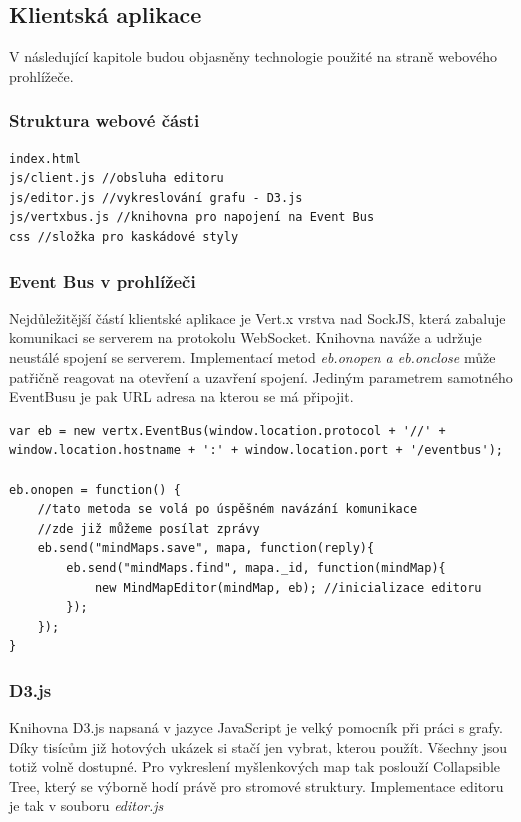 \subsection{Klientská aplikace}

V následující kapitole budou objasněny technologie použité na straně webového prohlížeče.

\subsubsection{Struktura webové části}

\begin{lstlisting}
index.html
js/client.js //obsluha editoru
js/editor.js //vykreslování grafu - D3.js
js/vertxbus.js //knihovna pro napojení na Event Bus
css //složka pro kaskádové styly
\end{lstlisting}


\subsubsection{Event Bus v prohlížeči}

Nejdůležitější částí klientské aplikace je Vert.x vrstva nad SockJS\cite{sockjs}, která zabaluje komunikaci se serverem na protokolu WebSocket\cite{webSockets}. Knihovna naváže a udržuje neustálé spojení se serverem. Implementací metod \emph{eb.onopen a eb.onclose} může patřičně reagovat na otevření a uzavření spojení. Jediným parametrem samotného EventBusu je pak URL adresa na kterou se má připojit.

\begin{lstlisting}[caption=Připojení Event busu z prohlížeče a inicializace editoru]
var eb = new vertx.EventBus(window.location.protocol + '//' + window.location.hostname + ':' + window.location.port + '/eventbus');

eb.onopen = function() {
	//tato metoda se volá po úspěšném navázání komunikace
	//zde již můžeme posílat zprávy
	eb.send("mindMaps.save", mapa, function(reply){
		eb.send("mindMaps.find", mapa._id, function(mindMap){
			new MindMapEditor(mindMap, eb); //inicializace editoru
		});	
	});
}
\end{lstlisting}

\subsubsection{D3.js}

Knihovna D3.js napsaná v jazyce JavaScript je velký pomocník při práci s grafy. Díky tisícům již hotových ukázek si stačí jen vybrat, kterou použít. Všechny jsou totiž volně dostupné. Pro vykreslení myšlenkových map tak poslouží Collapsible Tree\cite{d3js}, který se výborně hodí právě pro stromové struktury. Implementace editoru je tak v souboru \emph{editor.js}

